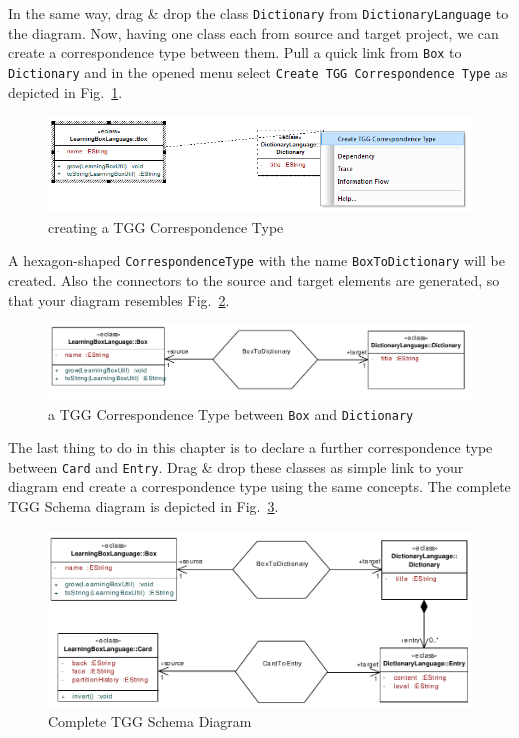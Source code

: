 In the same way, drag \& drop the class \texttt{Dictionary} from
\texttt{Dictionary\-Language} to the diagram. Now, having one class each from
source and target project, we can create a correspondence type between them.
Pull a quick link from \texttt{Box} to \texttt{Dictionary} and in the opened menu select \texttt{Create TGG Correspondence Type} as depicted in Fig.~\ref{fig:create_correspondence}.

\begin{figure}[htbp]
\begin{center}
  \includegraphics[width=\textwidth]{pics/tggBilder/tgg5}
  \caption{creating a TGG Correspondence Type} 
  \label{fig:create_correspondence}
\end{center}
\end{figure}

A hexagon-shaped \texttt{CorrespondenceType} with the name
\texttt{BoxToDictionary} will be created. Also the connectors to the source and
target elements are generated, so that your diagram resembles
Fig.~\ref{fig:first_correspondence}.

\begin{figure}[htbp]
\begin{center}
  \includegraphics[width=\textwidth]{pics/tggBilder/tgg6}
  \caption{a TGG Correspondence Type between \texttt{Box} and
  \texttt{Dictionary}}
  \label{fig:first_correspondence}
\end{center}
\end{figure}

The last thing to do in this chapter is to declare a further correspondence type
between \texttt{Card} and \texttt{Entry}. Drag \& drop these classes as simple
link to your diagram end create a correspondence type using the same concepts.
The complete TGG Schema diagram is depicted in
Fig.~\ref{fig:complete_tgg_schema}.

\begin{figure}[htbp]
\begin{center}
  \includegraphics[width=\textwidth]{pics/tggBilder/tgg7}
  \caption{Complete TGG Schema Diagram}
  \label{fig:complete_tgg_schema}
\end{center}
\end{figure}
